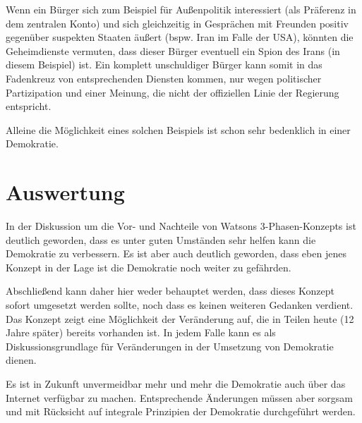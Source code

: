 \documentclass[12pt,twoside,ngerman]{scrartcl}
\theoremstyle{plain}
\theoremstyle{definition}
\theoremstyle{remark}
\begin{document}
	Wenn ein Bürger sich zum Beispiel für Außenpolitik interessiert (als Präferenz in dem zentralen Konto) und sich gleichzeitig in Gesprächen mit Freunden positiv gegenüber suspekten Staaten äußert (bspw. Iran im Falle der USA), könnten die Geheimdienste vermuten, dass dieser Bürger eventuell ein Spion des Irans (in diesem Beispiel) ist. Ein komplett unschuldiger Bürger kann somit in das Fadenkreuz von entsprechenden Diensten kommen, nur wegen politischer Partizipation und einer Meinung, die nicht der offiziellen Linie der Regierung entspricht.
	
	Alleine die Möglichkeit eines solchen Beispiels ist schon sehr bedenklich in einer Demokratie.
\section{Auswertung}
\label{sec:concl}

	In der Diskussion um die Vor- und Nachteile von Watsons 3-Phasen-Konzepts ist deutlich geworden, dass es unter guten Umständen sehr helfen kann die Demokratie zu verbessern. Es ist aber auch deutlich geworden, dass eben jenes Konzept in der Lage ist die Demokratie noch weiter zu gefährden.
	
	Abschließend kann daher hier weder behauptet werden, dass dieses Konzept sofort umgesetzt werden sollte, noch dass es keinen weiteren Gedanken verdient. Das Konzept zeigt eine Möglichkeit der Veränderung auf, die in Teilen heute (12 Jahre später) bereits vorhanden ist. In jedem Falle kann es als Diskussionsgrundlage für Veränderungen in der Umsetzung von Demokratie dienen.
	
	Es ist in Zukunft unvermeidbar mehr und mehr die Demokratie auch über das Internet verfügbar zu machen. Entsprechende Änderungen müssen aber sorgsam und mit Rücksicht auf integrale Prinzipien der Demokratie durchgeführt werden.

%
%
\clearpage


\end{document}
